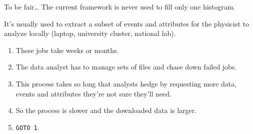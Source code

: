 \documentclass[aspectratio=169]{beamer}
\begin{document}
\begin{frame}{To be fair\ldots}
\vspace{0.5 cm}
\large The current framework is never used to fill only one histogram.

\vspace{0.5 cm}
It's usually used to extract a subset of events and attributes for the physicist to analyze locally (laptop, university cluster, national lab).

\vspace{0.25 cm}
\begin{enumerate}
\item<2-> These jobs take weeks or months.
\item<3-> The data analyst has to manage sets of files and chase down failed jobs.
\item<4-> This process takes so long that analysts hedge by requesting more data, events and attributes they're not sure they'll need.
\item<5-> So the process is slower and the downloaded data is larger.
\item<6-> {\tt\normalsize GOTO \textcolor{darkblue}{1}}.
\end{enumerate}
\end{frame}
\end{document}
